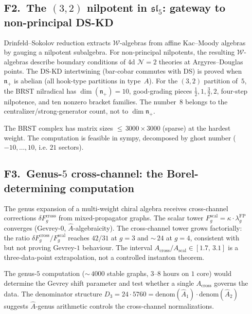 \documentclass[11pt]{article}
\newcommand{\cN}{\mathcal{N}}
\newcommand{\cW}{\mathcal{W}}
\begin{document}
\subsection{F2.\ The $(3,2)$ nilpotent in $\mathfrak{sl}_5$: gateway
to non-principal DS-KD}

Drinfeld--Sokolov reduction extracts $\cW$-algebras from affine
Kac--Moody algebras by gauging a nilpotent subalgebra.  For non-principal
nilpotents, the resulting $\cW$-algebras describe boundary conditions
of 4d $\cN{=}2$ theories at Argyres--Douglas points.  The DS-KD
intertwining (bar-cobar commutes with DS) is proved when
$\mathfrak{n}_+$ is abelian (all hook-type partitions in type~$A$).
For the $(3,2)$ partition of~$5$, the BRST nilradical has
$\dim(\mathfrak{n}_+) = 10$, good-grading pieces
$\tfrac12,1,\tfrac32,2$, four-step nilpotence, and ten
nonzero bracket families.  The number~$8$ belongs to the
centralizer/strong-generator count, not to $\dim\mathfrak{n}_+$.

The BRST complex has matrix sizes ${\leq}\,3000 \times 3000$ (sparse)
at the hardest weight.  The computation is feasible in sympy,
decomposed by ghost number ($-10,\ldots,10$, i.e. $21$ sectors).

\subsection{F3.\ Genus-$5$ cross-channel: the Borel-determining
computation}

The genus expansion of a multi-weight chiral algebra receives
cross-channel corrections $\delta F_g^{\mathrm{cross}}$ from
mixed-propagator graphs.  The scalar tower
$F_g^{\mathrm{scal}} = \kappa \cdot \lambda_g^{\mathrm{FP}}$
converges (Gevrey-$0$, $\hat{A}$-algebraicity).  The cross-channel
tower grows factorially: the ratio
$\delta F_g^{\mathrm{cross}} / F_g^{\mathrm{scal}}$ reaches
$42/31$ at $g = 3$ and ${\sim}\,24$ at $g = 4$, consistent with
but not proving Gevrey-$1$ behaviour.  The interval
$A_{\mathrm{cross}}/A_{\mathrm{scal}} \in [1.7,\, 3.1]$ is a
three-data-point extrapolation, not a controlled instanton theorem.

The genus-$5$ computation (${\sim}\,4000$ stable graphs,
$3$--$8$ hours on $1$ core) would determine the Gevrey shift
parameter and test whether a single $A_{\mathrm{cross}}$ governs
the data.  The denominator
structure $D_3 = 24 \cdot 5760 = \mathrm{denom}(\hat{A}_1) \cdot
\mathrm{denom}(\hat{A}_2)$ suggests $\hat{A}$-genus arithmetic
controls the cross-channel normalizations.
\end{document}
